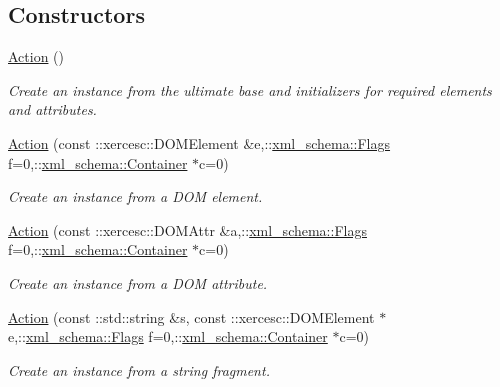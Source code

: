 \subsection*{Constructors}
\begin{DoxyCompactItemize}
\item 
\hypertarget{classopenstack_1_1xml_1_1Action_a7a816e1892666bfd4fe0bd5b394333b8}{
\hyperlink{classopenstack_1_1xml_1_1Action_a7a816e1892666bfd4fe0bd5b394333b8}{Action} ()}
\label{classopenstack_1_1xml_1_1Action_a7a816e1892666bfd4fe0bd5b394333b8}

\begin{DoxyCompactList}\small\item\em Create an instance from the ultimate base and initializers for required elements and attributes. \item\end{DoxyCompactList}\item 
\hyperlink{classopenstack_1_1xml_1_1Action_a76ebc9fe7f8f385676ce333d63d54902}{Action} (const ::xercesc::DOMElement \&e,::\hyperlink{namespacexml__schema_affb4c227cbd9aa7453dd1dc5a1401943}{xml\_\-schema::Flags} f=0,::\hyperlink{namespacexml__schema_a333dea2213742aea47a37532dec4ec27}{xml\_\-schema::Container} $\ast$c=0)
\begin{DoxyCompactList}\small\item\em Create an instance from a DOM element. \item\end{DoxyCompactList}\item 
\hyperlink{classopenstack_1_1xml_1_1Action_a51848717fd618646dec95d3c86a8f850}{Action} (const ::xercesc::DOMAttr \&a,::\hyperlink{namespacexml__schema_affb4c227cbd9aa7453dd1dc5a1401943}{xml\_\-schema::Flags} f=0,::\hyperlink{namespacexml__schema_a333dea2213742aea47a37532dec4ec27}{xml\_\-schema::Container} $\ast$c=0)
\begin{DoxyCompactList}\small\item\em Create an instance from a DOM attribute. \item\end{DoxyCompactList}\item 
\hyperlink{classopenstack_1_1xml_1_1Action_abc3ed19269fc57b20a5b52a436ce7e8f}{Action} (const ::std::string \&s, const ::xercesc::DOMElement $\ast$e,::\hyperlink{namespacexml__schema_affb4c227cbd9aa7453dd1dc5a1401943}{xml\_\-schema::Flags} f=0,::\hyperlink{namespacexml__schema_a333dea2213742aea47a37532dec4ec27}{xml\_\-schema::Container} $\ast$c=0)
\begin{DoxyCompactList}\small\item\em Create an instance from a string fragment. \item\end{DoxyCompactList}\item 

\end{DoxyCompactItemize}
